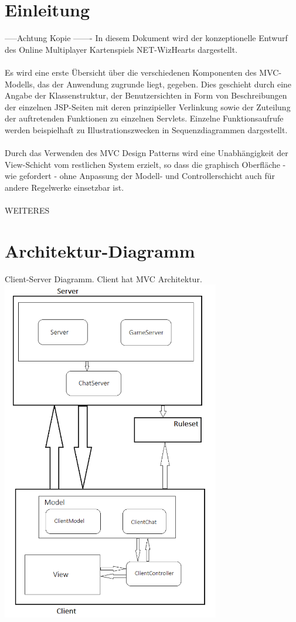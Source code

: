 \documentclass{article}
\begin{document}
\tableofcontents
\newpage

\section{Einleitung}
-----Achtung Kopie -------
In diesem Dokument wird der konzeptionelle Entwurf des Online Multiplayer Kartenspiels NET-WizHearts dargestellt.\\
\ \\
Es wird eine erste Übersicht über die verschiedenen Komponenten des MVC-
Modells, das der Anwendung zugrunde liegt, gegeben. Dies geschieht durch eine
Angabe der Klassenstruktur, der Benutzersichten in Form von Beschreibungen
der einzelnen JSP-Seiten mit deren prinzipieller Verlinkung sowie der Zuteilung
der auftretenden Funktionen zu einzelnen Servlets. Einzelne Funktionsaufrufe
werden beispielhaft zu Illustrationszwecken in Sequenzdiagrammen dargestellt.\\
\ \\
Durch das Verwenden des MVC Design Patterns wird eine Unabhängigkeit der View-Schicht 
vom restlichen System erzielt, so dass die graphisch Oberfläche - wie gefordert - ohne Anpassung 
der Modell- und Controllerschicht auch für andere Regelwerke einsetzbar ist.\\
\  \\
WEITERES


\section{Architektur-Diagramm}
Client-Server Diagramm. Client hat MVC Architektur.
\  \\
\includegraphics[height=15cm]{ArchitekturDiagramm}
\newpage
\end{document}
